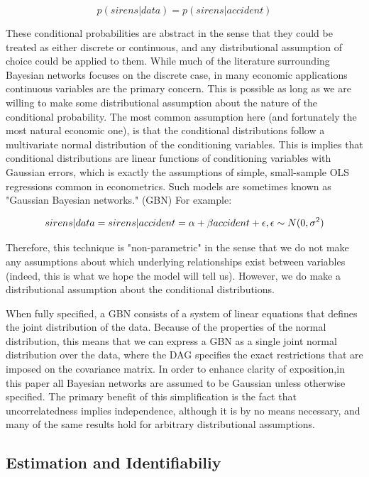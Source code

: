 \documentclass{article}
\begin{document}
\begin{equation}
  \label{eq1}
  p(sirens | data) = p(sirens | accident)
\end{equation}

These conditional probabilities are abstract in the sense that they could be treated as either discrete or continuous, and any distributional assumption of choice could be applied to them. While much of the literature surrounding Bayesian networks focuses on the discrete case, in many economic applications continuous variables are the primary concern. This is possible as long as we are willing to make some distributional assumption about the nature of the conditional probability. The most common assumption here (and fortunately the most natural economic one), is that the conditional distributions follow a multivariate normal distribution of the conditioning variables. This is implies that conditional distributions are linear functions of conditioning variables with Gaussian errors, which is exactly the assumptions of simple, small-sample OLS regressions common in econometrics. Such models are sometimes known as "Gaussian Bayesian networks." (GBN) For example:

\begin{equation}
  \label{eq2}
  sirens|data = sirens|accident = \alpha + \beta accident + \epsilon, \space \epsilon \sim N(0, \sigma^2)
\end{equation}

Therefore, this technique is "non-parametric" in the sense that we do not make any assumptions about which underlying relationships exist between variables (indeed, this is what we hope the model will tell us). However, we do make a distributional assumption about the conditional distributions.

When fully specified, a GBN consists of a system of linear equations that defines the joint distribution of the data. Because of the properties of the normal distribution, this means that we can express a GBN as a single joint normal distribution over the data, where the DAG specifies the exact restrictions that are imposed on the covariance matrix. In order to enhance clarity of exposition,in this paper all Bayesian networks are assumed to be Gaussian unless otherwise specified. The primary benefit of this simplification is the fact that uncorrelatedness implies independence, although it is by no means necessary, and many of the same results hold for arbitrary distributional assumptions.

\subsection{Estimation and Identifiabiliy}
\end{document}
